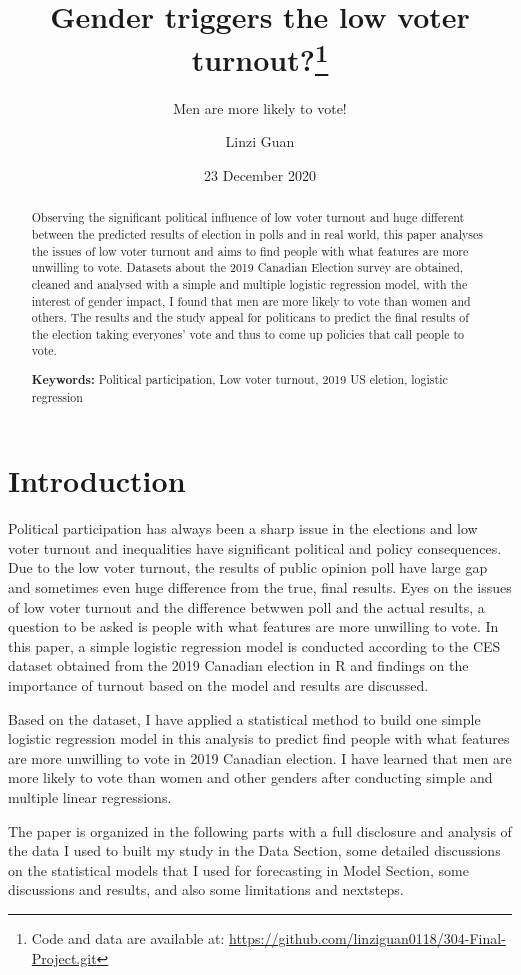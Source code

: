 \documentclass[
]{article}
\title{Gender triggers the low voter turnout?\thanks{Code and data are available at:
\url{https://github.com/linziguan0118/304-Final-Project.git}}}
\subtitle{Men are more likely to vote!}
\author{Linzi Guan}
\date{23 December 2020}
\begin{document}
\maketitle
\begin{abstract}
Observing the significant political influence of low voter turnout and
huge different between the predicted results of election in polls and in
real world, this paper analyses the issues of low voter turnout and aims
to find people with what features are more unwilling to vote. Datasets
about the 2019 Canadian Election survey are obtained, cleaned and
analysed with a simple and multiple logistic regression model, with the
interest of gender impact, I found that men are more likely to vote than
women and others. The results and the study appeal for politicans to
predict the final results of the election taking everyones' vote and
thus to come up policies that call people to vote.

\textbf{Keywords:} Political participation, Low voter turnout, 2019 US
eletion, logistic regression
\end{abstract}

\hypertarget{introduction}{%
\section{Introduction}\label{introduction}}

Political participation has always been a sharp issue in the elections
and low voter turnout and inequalities have significant political and
policy consequences. Due to the low voter turnout, the results of public
opinion poll have large gap and sometimes even huge difference from the
true, final results. Eyes on the issues of low voter turnout and the
difference betwwen poll and the actual results, a question to be asked
is people with what features are more unwilling to vote. In this paper,
a simple logistic regression model is conducted according to the CES
dataset obtained from the 2019 Canadian election in R and findings on
the importance of turnout based on the model and results are discussed.

Based on the dataset, I have applied a statistical method to build one
simple logistic regression model in this analysis to predict find people
with what features are more unwilling to vote in 2019 Canadian election.
I have learned that men are more likely to vote than women and other
genders after conducting simple and multiple linear regressions.

The paper is organized in the following parts with a full disclosure and
analysis of the data I used to built my study in the Data Section, some
detailed discussions on the statistical models that I used for
forecasting in Model Section, some discussions and results, and also
some limitations and nextsteps.
\end{document}
